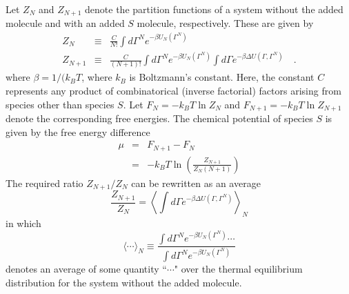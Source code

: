 \documentclass[12pt]{article} %
\newcommand\system{\Gamma^{N}}
\newcommand\chain{\Gamma}
\newcommand\Usys{U_{N}}
\newcommand\delU{\Delta U}
\newcommand\Ztot{Z_{N+1}}
\newcommand\Zsystem{Z_{N}}
\newcommand\Ftot{F_{N+1}}
\newcommand\Fsystem{F_{N}}
\begin{document}
Let $\Zsystem$ and $\Ztot$ denote the partition functions of a system without the added molecule and with an added $S$ molecule, respectively. These are given by
\begin{eqnarray}
    \Zsystem & \equiv & \frac{C}{N!}\int d\system e^{-\beta \Usys(\system)} \\
    \Ztot  & \equiv & \frac{C}{(N+1)!}\int d\system e^{-\beta \Usys(\system)} 
                       \int d\chain e^{-\beta \delU(\chain, \system)}
    \quad.
\end{eqnarray}
where $\beta = 1/(k_{B}T$, where $k_{B}$ is Boltzmann's constant.  Here, the constant $C$ represents any product of combinatorical (inverse factorial) factors arising from species other than species $S$.  Let $\Fsystem = -k_{B}T\ln \Zsystem$ and $\Ftot = -k_{B}T\ln \Ztot$ denote the corresponding free energies.  The chemical potential of species $S$ is given by the free energy difference
\begin{eqnarray}
   \mu & = & \Ftot - \Fsystem \nonumber \\
       & = & -k_{B}T \ln \left ( \frac{\Ztot}{\Zsystem (N+1)} \right )
      \label{mudef}
\end{eqnarray}
The required ratio $\Ztot/\Zsystem$ can be rewritten as an average
\begin{equation}
  \frac{\Ztot}{\Zsystem} = 
  \left \langle \int d\chain e^{-\beta \delU(\chain, \system)} \right \rangle_{N}
\end{equation}
in which 
\begin{equation}
  \langle \cdots \rangle_{N} \equiv
  \frac{ \int d\system e^{-\beta \Usys(\system)} \cdots }
       { \int d\system e^{-\beta \Usys(\system)}}
\end{equation}
denotes an average of some quantity ``$\cdots$" over the thermal equilibrium 
distribution for the system without the added molecule. 
\end{document}
